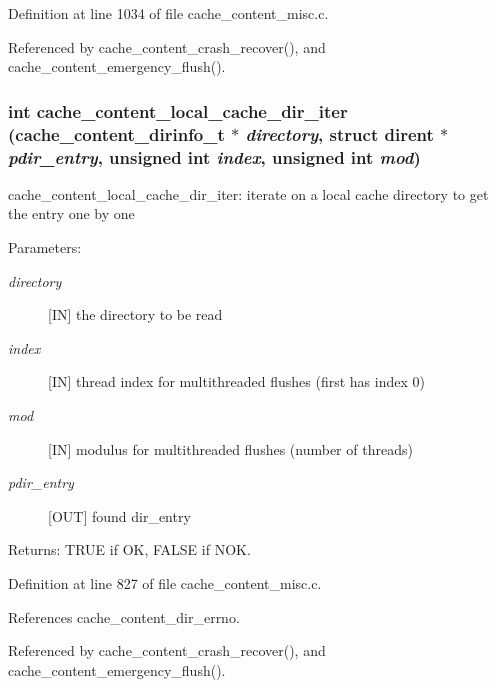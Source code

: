 Definition at line 1034 of file cache\_\-content\_\-misc.c.

Referenced by cache\_\-content\_\-crash\_\-recover(), and cache\_\-content\_\-emergency\_\-flush().
\subsubsection{\setlength{\rightskip}{0pt plus 5cm}int cache\_\-content\_\-local\_\-cache\_\-dir\_\-iter (cache\_\-content\_\-dirinfo\_\-t $\ast$ {\em directory}, struct dirent $\ast$ {\em pdir\_\-entry}, unsigned int {\em index}, unsigned int {\em mod})}\label{cache__content__misc_8c_a18}


cache\_\-content\_\-local\_\-cache\_\-dir\_\-iter: iterate on a local cache directory to get the entry one by one

\begin{Desc}
\item[Parameters:]
\begin{description}
\item[{\em directory}][IN] the directory to be read \item[{\em index}][IN] thread index for multithreaded flushes (first has index 0) \item[{\em mod}][IN] modulus for multithreaded flushes (number of threads) \item[{\em pdir\_\-entry}][OUT] found dir\_\-entry\end{description}
\end{Desc}
\begin{Desc}
\item[Returns:]TRUE if OK, FALSE if NOK. \end{Desc}


Definition at line 827 of file cache\_\-content\_\-misc.c.

References cache\_\-content\_\-dir\_\-errno.

Referenced by cache\_\-content\_\-crash\_\-recover(), and cache\_\-content\_\-emergency\_\-flush().
